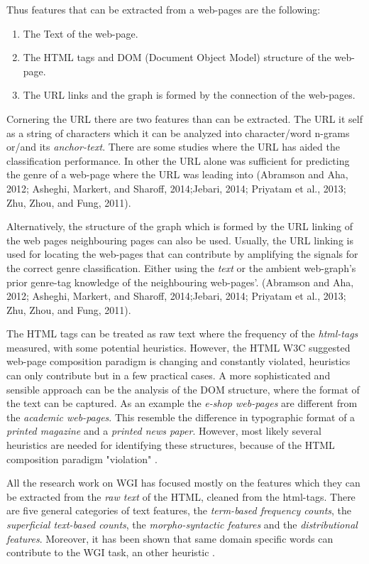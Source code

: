 Thus features that can be extracted from a web-pages are the following:

\begin{enumerate}
\item The Text of the web-page.
\item The HTML tags and DOM (Document Object Model) structure of the web-page. 
\item The URL links and the graph is formed by the connection of the web-pages.
\end{enumerate}

Cornering the URL there are two features than can be extracted. The URL it self as a string of characters which it can be analyzed into character/word n-grams or/and its \textit{anchor-text}. There are some studies where the URL has aided the classification performance. In other the URL alone was sufficient for predicting the genre of a web-page where the URL was leading into (Abramson and Aha, 2012; Asheghi, Markert, and Sharoff, 2014;Jebari, 2014; Priyatam et al., 2013; Zhu, Zhou, and Fung, 2011).

Alternatively, the structure of the graph which is formed by the URL linking of the web pages neighbouring pages can also be used. Usually, the URL linking is used for locating the web-pages that can contribute by amplifying the signals for the correct genre classification. Either using the \textit{text} or the ambient web-graph's prior genre-tag knowledge of the neighbouring web-pages'. (Abramson and Aha, 2012; Asheghi, Markert, and Sharoff, 2014;Jebari, 2014; Priyatam et al., 2013; Zhu, Zhou, and Fung, 2011).

The HTML tags can be treated as raw text where the frequency of the \textit{html-tags} measured, with some potential heuristics. However, the HTML W3C suggested web-page composition paradigm is changing and constantly violated, heuristics can only contribute but in a few practical cases. A more sophisticated and sensible approach can be the analysis of the DOM structure, where the format of the text can be captured. As an example the \textit{e-shop web-pages} are different from the \textit{academic web-pages}. This resemble the difference in typographic format of a \textit{printed magazine} and a \textit{printed news paper}. However, most likely several heuristics are needed for identifying these structures, because of the HTML composition paradigm "violation" \parencite{mehler2011integrating,mehler2011integrating}.

All the research work on WGI has focused mostly on the features which they can be extracted from the \textit{raw text} of the  HTML, cleaned from the html-tags. There are five general categories of text features, the \textit{term-based frequency counts}, the \textit{superficial text-based counts}, the \textit{morpho-syntactic features} and the \textit{distributional features}. Moreover, it has been shown that same domain specific words can contribute to the WGI task, an other heuristic \parencite{mason2009classifying,sharoff2010web,Sharroff2010,Nooralahzadeh2014,onan2018ensemble}. 

